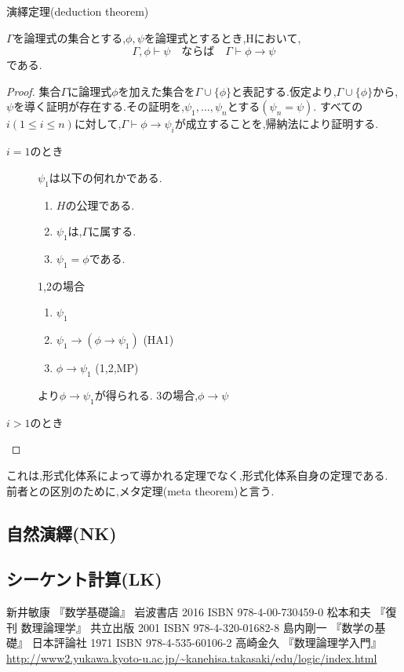 \begin{thm}
 演繹定理(deduction theorem)

 $\Gamma$を論理式の集合とする,$\phi,\psi$を論理式とするとき,Hにおいて,
 \begin{equation*}
  \Gamma, \phi \vdash \psi \quad ならば \quad \Gamma \vdash \phi \to \psi
 \end{equation*}
 である.

\end{thm}
\begin{proof}
 集合$\Gamma$に論理式$\phi$を加えた集合を$\Gamma \cup \{\phi\}$と表記する.仮定より,$\Gamma \cup \{\phi\}$から,$\psi$を導く証明が存在する.その証明を,$\psi_1,...,\psi_n$とする$(\psi_n=\psi)$.
すべての$i(1 \leq i \leq n)$に対して,$\Gamma \vdash \phi \to \psi_i$が成立することを,帰納法により証明する.
 \begin{description}
  \item[$i=1$のとき] $\psi_1$は以下の何れかである.
			 \begin{enumerate}
			  \item $H$の公理である.
			  \item $\psi_1$は,$\Gamma$に属する.
			  \item $\psi_1=\phi$である.
			 \end{enumerate}
			 1,2の場合
			 \begin{enumerate}
			  \renewcommand{\labelenumi}{\arabic{enumi})}
			  \item $\psi_1$
			  \item $\psi_1 \to (\phi \to \psi_1)$ (HA1)
			  \item $\phi \to \psi_1$ (1,2,MP)
			 \end{enumerate}
			 より$\phi \to \psi_1$が得られる.
			 3の場合,$\phi \to \psi$
   \item[$i>1$のとき]
 \end{description}
\end{proof}
これは,形式化体系によって導かれる定理でなく,形式化体系自身の定理である.
前者との区別のために,メタ定理(meta theorem)と言う.

\subsection{自然演繹(NK)}

\subsection{シーケント計算(LK)}

\begin{thebibliography}{9}
		新井敏康 『数学基礎論』 岩波書店 2016 ISBN 978-4-00-730459-0
		松本和夫 『復刊 数理論理学』 共立出版 2001 ISBN 978-4-320-01682-8
		島内剛一 『数学の基礎』 日本評論社 1971 ISBN 978-4-535-60106-2
		高崎金久 『数理論理学入門』 \url{http://www2.yukawa.kyoto-u.ac.jp/~kanehisa.takasaki/edu/logic/index.html}
\end{thebibliography}
